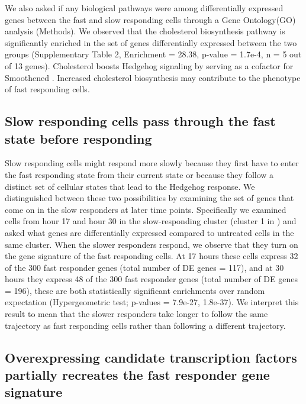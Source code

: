 We also asked if any biological pathways were among differentially expressed genes between the fast and slow responding cells through a Gene Ontology(GO) analysis (Methods). We observed that the cholesterol biosynthesis pathway is significantly enriched in the set of genes differentially expressed between the two groups (Supplementary Table 2, Enrichment = 28.38, p-value = 1.7e-4, n = 5 out of 13 genes). Cholesterol boosts Hedgehog signaling by serving as a cofactor for Smoothened \cite{Huang2018-iz,Huang2016-er,Kinnebrew2019-gt,Luchetti2016-cd,Radhakrishnan2020-ii}. Increased cholesterol biosynthesis may contribute to the phenotype of fast responding cells. 


\subsection{Slow responding cells pass through the fast state before responding}

Slow responding cells might respond more slowly because they first have to enter the fast responding state from their current state or because they follow a distinct set of cellular states that lead to the Hedgehog response. We distinguished between these two possibilities by examining the set of genes that come on in the slow responders at later time points. Specifically we examined cells from hour 17 and hour 30 in the slow-responding cluster (cluster 1 in ) and asked what genes are differentially expressed compared to untreated cells in the same cluster. When the slower responders respond, we observe that they turn on the gene signature of the fast responding cells. At 17 hours these cells express 32 of the 300 fast responder genes (total number of DE genes = 117), and at 30 hours they express 48 of the 300 fast responder genes (total number of DE genes = 196), these are both statistically significant enrichments over random expectation (Hypergeometric test; p-values = 7.9e-27, 1.8e-37). We interpret this result to mean that the slower responders take longer to follow the same trajectory as fast responding cells rather than following a different trajectory.

\subsection{Overexpressing candidate transcription factors partially recreates the fast responder gene signature}

